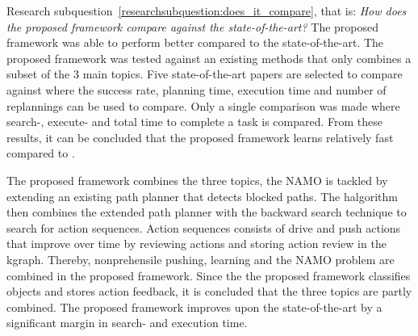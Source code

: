 Research subquestion~\ref{researchsubquestion:does_it_compare}, that is: \textit{How does the proposed framework compare against the state-of-the-art?} The proposed framework was able to perform better compared to the state-of-the-art. The proposed framework was tested against an existing methods that only combines a subset of the 3 main topics. Five state-of-the-art papers are selected to compare against where the success rate, planning time, execution time and number of replannings can be used to compare. Only a single comparison was made where search-, execute- and total time to complete a task is compared. From these results, it can be concluded that the proposed framework learns relatively fast compared to \citeauthor{wang_affordancebased_2020}. 

The proposed framework combines the three topics, the \ac{NAMO} is tackled by extending an existing path planner that detects blocked paths. The \ac{halgorithm} then combines the extended path planner with the backward search technique to search for action sequences. Action sequences consists of drive and push actions that improve over time by reviewing actions and storing action review in the \ac{kgraph}. Thereby, nonprehensile pushing, learning and the \ac{NAMO} problem are combined in the proposed framework. Since the the proposed framework classifies objects and stores action feedback, it is concluded that the three topics are partly combined. The proposed framework improves upon the state-of-the-art by a significant margin in search- and execution time.\bs
